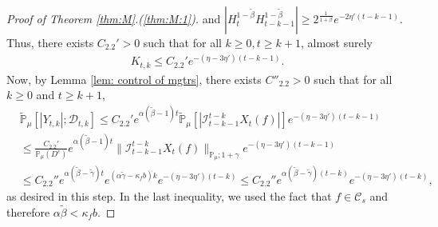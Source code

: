 \documentclass[EJP]{ejpecp} %
\begin{document}
\begin{proof}[Proof of Theorem \ref{thm:M}.(\ref{thm:M:1})]
  and $ |H_t^{1 - \tilde \beta} H_{t-k-1}^{ 1 - \tilde \beta}| \geq 2^{\frac{1}{1+\beta}} e^{-2\eta'(t-k-1)}$.
  Thus, there exists $C_{2.2}'> 0$ such that for all $k \geq 0, t\geq k+1$, almost surely
  \begin{align}
    K_{t,k}
    \leq C_{2.2}' e^{-(\eta - 3\eta')(t-k-1)}.
  \end{align}
  Now, by Lemma \ref{lem: control of mgtrs}, there exists $C''_{2.2}>0$ such that for all $k\geq 0$ and $t\geq k+1$,
  \begin{align}
    \label{eq: Y in D}
    & \mathbb{\widetilde{P}}_{\mu} [|Y_{t,k}| ; \mathcal{D}_{t,k} ]
    \leq C_{2.2}' e^{\alpha (\tilde \beta - 1)t} \mathbb{\widetilde{P}}_{\mu} [ | \mathcal{I}_{t-k-1}^{t-k}X_t(f)| ] e^{-(\eta - 3\eta')(t-k-1)} \\
    & \leq \frac{C_{2.2}' } {\mathbb{P}_{\mu}(D^c)} e^{ \alpha (\tilde \beta - 1)t} \|\mathcal{I}_{t-k-1}^{t-k} X_t(f)\|_{\mathbb P_\mu; 1+\gamma} e^{-(\eta - 3\eta')(t-k - 1)} \\
    & \leq C_{2.2}'' e^{\alpha(\tilde \beta - \tilde \gamma)t} e^{ (\alpha \tilde \gamma - \kappa_f b)k} e^{-(\eta - 3\eta')(t-k)}
     \leq C_{2.2}'' e^{\alpha(\tilde \beta - \tilde \gamma)(t-k)} e^{-(\eta - 3\eta')(t-k)},
  \end{align}
  as desired in this step.
  In the last inequality, we used the fact that $f\in \mathcal C_s$ and therefore $\alpha \tilde \beta < \kappa_f b$.


\end{proof}
\end{document}
